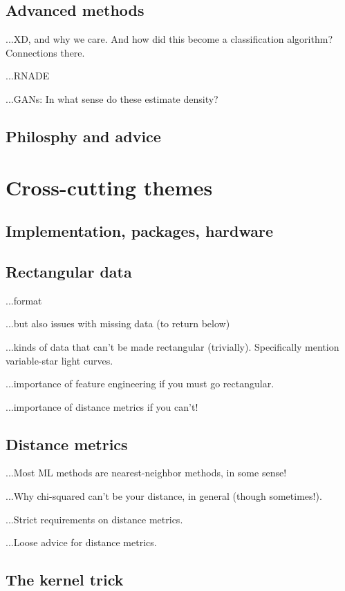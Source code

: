 \documentclass[12pt, twoside, letterpaper]{article}
\begin{document}
\subsection{Advanced methods}

...XD, and why we care. And how did this become a classification algorithm? Connections there.

...RNADE

...GANs: In what sense do these estimate density?

\subsection{Philosphy and advice}

\section{Cross-cutting themes}

\subsection{Implementation, packages, hardware}

\subsection{Rectangular data}

...format

...but also issues with missing data (to return below)

...kinds of data that can't be made rectangular (trivially). Specifically mention variable-star light curves.

...importance of feature engineering if you must go rectangular.

...importance of distance metrics if you can't!

\subsection{Distance metrics}

...Most ML methods are nearest-neighbor methods, in some sense!

...Why chi-squared can't be your distance, in general (though sometimes!).

...Strict requirements on distance metrics.

...Loose advice for distance metrics.

\subsection{The kernel trick}
\end{document}

